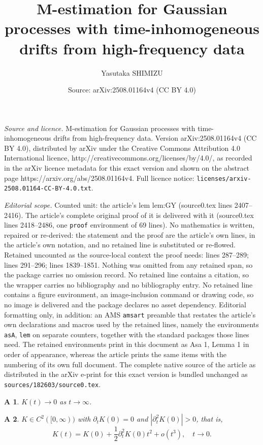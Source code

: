 \documentclass[10pt,a4paper]{amsart}
\title{M-estimation for Gaussian processes with time-inhomogeneous drifts from high-frequency data}
\author{Yasutaka SHIMIZU}
\date{Source: arXiv:2508.01164v4 (CC BY 4.0)}
\newtheorem{asA}{A}
\def\p{\partial}
\begin{document}
\maketitle

\noindent\emph{Source and licence.} M-estimation for Gaussian processes with time-inhomogeneous drifts from high-frequency data. Version arXiv:2508.01164v4 (CC BY 4.0), distributed by arXiv under the Creative Commons Attribution 4.0 International licence, http://creativecommons.org/licenses/by/4.0/, as recorded in the arXiv licence metadata for this exact version and shown on the abstract page https://arxiv.org/abs/2508.01164v4. Full licence notice: \texttt{licenses/arxiv-2508.01164-CC-BY-4.0.txt}.\par\smallskip

\noindent\textit{Editorial scope.} Counted unit: the article's lem lem:GY (source0.tex lines 2407--2416). The article's complete original proof of it is delivered with it (source0.tex lines 2418--2486, one \texttt{proof} environment of 69 lines). No mathematics is written, repaired or re-derived: the statement and the proof are the article's own lines, in the article's own notation, and no retained line is substituted or re-flowed.  Retained uncounted as the source-local context the proof needs: lines 287--289; lines 291--296; lines 1839--1851.  Nothing was omitted from any retained span, so the package carries no omission record.  No retained line contains a citation, so the wrapper carries no bibliography and no bibliography entry.  No retained line contains a figure environment, an image-inclusion command or drawing code, so no image is delivered and the package declares no asset dependency.  Editorial formatting only, in addition: an AMS \texttt{amsart} preamble that restates the article's own declarations and macros used by the retained lines, namely the environments \texttt{asA}, \texttt{lem} on separate counters, together with the standard packages those lines need.  The retained environments print in this document as Asa 1, Lemma 1 in order of appearance, whereas the article prints the same items with the numbering of its own full document.  The complete native source of the article as distributed in the arXiv e-print for this exact version is bundled unchanged as \texttt{sources/182603/source0.tex}.
\begin{asA}\label{as:2}
$K(t) \to 0$ as $t \to \infty$.
\end{asA}

\begin{asA}\label{as:3}
 $K \in C^2([0,\infty))$ with $\p_t K(0) = 0$ and $|\p_t^2 K(0)| > 0$, that is,
\[
K(t) = K(0) + \frac{1}{2} \p_t^2 K(0) t^2 + o(t^3), \quad t \to 0.
\]
\end{asA}
\end{document}
